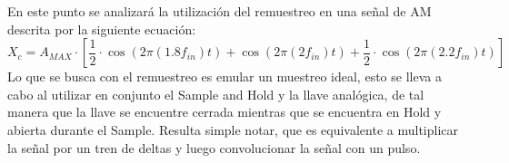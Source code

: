 


En este punto se analizará la utilización del remuestreo en una señal de AM descrita por la siguiente ecuación:
\begin{equation}
X_c = A_{MAX} \cdot \left[ \frac{1}{2} \cdot \cos (2 \pi (1.8 f_{in}) t) +\cos (2 \pi (2 f_{in}) t)  + \frac{1}{2} \cdot \cos (2 \pi (2.2 f_{in}) t) \right]
\end{equation}
Lo que se busca con el remuestreo es emular un muestreo ideal, esto se lleva a cabo al utilizar en conjunto el Sample and Hold y la llave analógica, de tal manera que la llave se encuentre cerrada mientras que  se encuentra en Hold y abierta durante el Sample. Resulta simple notar, que es equivalente a multiplicar la señal por un tren de deltas y luego convolucionar la señal con un pulso.
	
